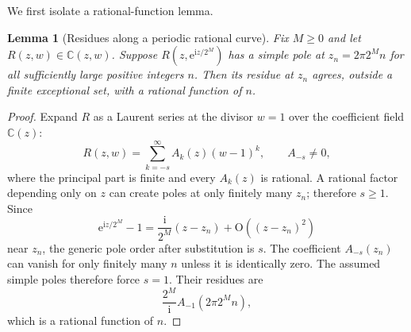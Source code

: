 \documentclass[11pt]{article}
\numberwithin{equation}{section}
\newtheorem{lemma}[theorem]{Lemma}
\theoremstyle{definition}
\theoremstyle{remark}
\newcommand{\C}{\mathbb C}
\newcommand{\ii}{\mathrm i}
\newcommand{\e}{\mathrm e}
\newcommand{\Oh}{\mathrm O}
\begin{document}
We first isolate a rational-function lemma.

\begin{lemma}[Residues along a periodic rational curve]
\label{lem:rational-residues}
Fix $M\ge0$ and let
$R(z,w)\in\C(z,w)$.  Suppose $R(z,\e^{\ii z/2^M})$ has a simple pole at
$z_n=2\pi2^Mn$ for all sufficiently large positive integers $n$.  Then its
residue at $z_n$ agrees, outside a finite exceptional set, with a rational
function of $n$.
\end{lemma}
\begin{proof}
Expand $R$ as a Laurent series at the divisor $w=1$ over the coefficient field
$\C(z)$:
\begin{equation}
 R(z,w)=\sum_{k=-s}^{\infty}A_k(z)(w-1)^k,
 \qquad A_{-s}\ne0,
 \label{eq:Laurent-w1}
\end{equation}
where the principal part is finite and every $A_k(z)$ is rational.  A rational
factor depending only on $z$ can create poles at only finitely many $z_n$;
therefore $s\ge1$.  Since
\begin{equation}
 \e^{\ii z/2^M}-1
 =\frac{\ii}{2^M}(z-z_n)+\Oh((z-z_n)^2)
 \label{eq:exp-local}
\end{equation}
near $z_n$, the generic pole order after substitution is $s$.  The coefficient
$A_{-s}(z_n)$ can vanish for only finitely many $n$ unless it is identically
zero.  The assumed simple poles therefore force $s=1$.  Their residues are
\begin{equation}
 \frac{2^M}{\ii}A_{-1}(2\pi2^Mn),
 \label{eq:rational-residue-n}
\end{equation}
which is a rational function of $n$.
\end{proof}
\end{document}
